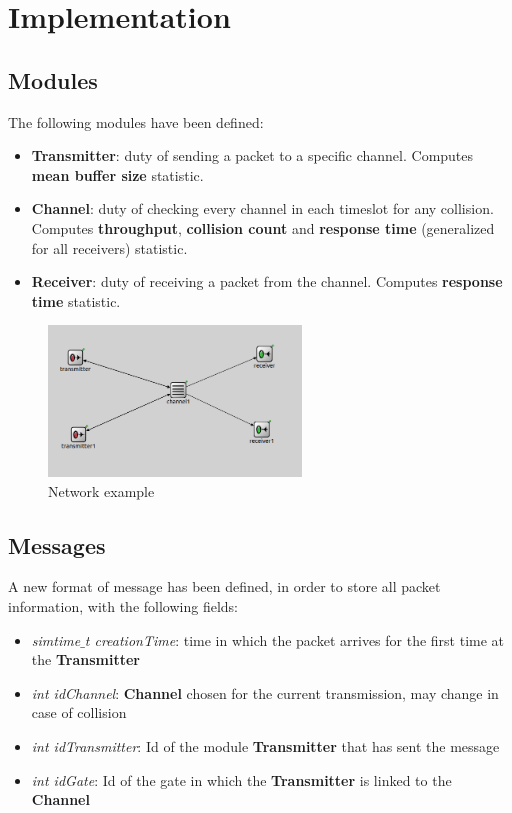 \section{Implementation}
\subsection{Modules}
The following modules have been defined:
\begin{itemize}
	\item \textbf{Transmitter}: duty of sending a packet to a specific channel. Computes \textbf{mean buffer size} statistic.%
	\item \textbf{Channel}: duty of checking every channel in each timeslot for any collision. Computes \textbf{throughput}, \textbf{collision count} and \textbf{response time} (generalized for all receivers) statistic.%
	\item \textbf{Receiver}: duty of receiving a packet from the channel. Computes \textbf{response time} statistic.
\end{itemize}

\begin{figure}[H]
	\centering
	\includegraphics[width=0.6\textwidth]{img/network.png}
	\caption{Network example}
	\label {img: network}
\end{figure}

\subsection{Messages}
A new format of message has been defined, in order to store all packet information, with the following fields:
\begin{itemize}
	\item \textit{simtime$\_$t creationTime}: time in which the packet arrives for the first time at the \textbf{Transmitter}
	\item \textit{int idChannel}: \textbf{Channel} chosen for the current transmission, may change in case of collision
	\item \textit{int idTransmitter}: Id of the module \textbf{Transmitter} that has sent the message
	\item \textit{int idGate}: Id of the gate in which the \textbf{Transmitter} is linked to the \textbf{Channel}
\end{itemize}

